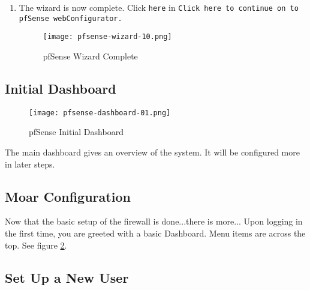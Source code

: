 \begin{enumerate}
 \item The wizard is now complete. Click \texttt{here} in \texttt{Click here to continue on to pfSense webConfigurator.}
\begin{figure}[h!]
\begin{center}
\texttt{[image: pfsense-wizard-10.png]}
 \caption{pfSense Wizard Complete}
 \label{fig:pfsense-wizard-10}
\end{center}
\end{figure}

\end{enumerate}

\subsection{Initial Dashboard}
\begin{figure}[h!]
\begin{center}
\texttt{[image: pfsense-dashboard-01.png]}
 \caption{pfSense Initial Dashboard}
 \label{fig:pfsense-dashboard-01}
\end{center}
\end{figure}

The main dashboard gives an overview of the system. It will be configured more in later steps.


\subsection{Moar Configuration}
Now that the basic setup of the firewall is done...there is more...
Upon logging in the first time, you are greeted with a basic Dashboard. Menu items are across the top.
See figure \ref{fig:pfsense-dashboard-01}.

\subsection{Set Up a New User}

